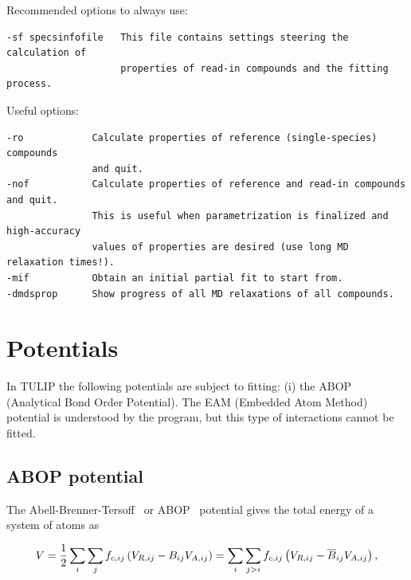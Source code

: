 \documentclass[a4paper,12pt,pdftex,onecolumn]{article}
\begin{document}
Recommended options to always use:

\begin{Verbatim}[fontsize=\relsize{-1},frame=single]
-sf specsinfofile   This file contains settings steering the calculation of
                    properties of read-in compounds and the fitting process.
\end{Verbatim}

Useful options:

\begin{Verbatim}[fontsize=\relsize{-1},frame=single]
-ro            Calculate properties of reference (single-species) compounds
               and quit.
-nof           Calculate properties of reference and read-in compounds and quit.
               This is useful when parametrization is finalized and high-accuracy
               values of properties are desired (use long MD relaxation times!).
-mif           Obtain an initial partial fit to start from.
-dmdsprop      Show progress of all MD relaxations of all compounds.
\end{Verbatim}







\section{Potentials}

In \textsc{TULIP} the following potentials are subject to fitting:
(i)  the ABOP (Analytical Bond Order Potential).
The EAM (Embedded Atom Method) potential is understood by the
program, but this type of interactions cannot be fitted.






\subsection{ABOP potential}

The Abell-Brenner-Tersoff~\cite{Abell-PRB31-1985,Brenner-PRB42-1990,Tersoff-PRL56-1986}
or ABOP~\cite{Juslin-JAP98-2005} potential gives the total energy of a system of atoms as

\begin{equation}
V = {1 \over 2} \sum_i \sum_{j} f_{c,ij} \left( V_{R,ij} - B_{ij} V_{A,ij} \right)
= \sum_i \sum_{j>i} f_{c,ij} \left( V_{R,ij} - \overline{B}_{ij} V_{A,ij} \right),
\label{eq:abop}
\end{equation}
\end{document}
